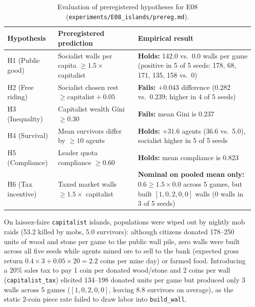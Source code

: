 \documentclass[10pt,letterpaper]{article}
\begin{document}
\begin{table}[!htb]
\centering
\caption{Evaluation of preregistered hypotheses for E08 (\texttt{experiments/E08\_islands/prereg.md}).}
\label{tab:e08_hyp}
\footnotesize
\setlength{\tabcolsep}{5pt}
\begin{tabularx}{\textwidth}{@{}l>{\raggedright\arraybackslash}p{4.6cm}>{\raggedright\arraybackslash}X@{}}
\toprule
\textbf{Hypothesis} & \textbf{Preregistered prediction} & \textbf{Empirical result} \\
\midrule
H1 (Public good) & Socialist walls per capita $\ge 1.5\times$ capitalist & \textbf{Holds:} 142.0 vs.\ 0.0 walls per game (positive in 5 of 5 seeds: 178, 68, 171, 135, 158 vs.\ 0) \\
H2 (Free riding) & Socialist chosen rest $\ge \text{capitalist} + 0.05$ & \textbf{Fails:} $+0.043$ difference (0.282 vs.\ 0.239; higher in 4 of 5 seeds) \\
H3 (Inequality) & Capitalist wealth Gini $\ge 0.30$ & \textbf{Fails:} mean Gini is 0.237 \\
H4 (Survival) & Mean survivors differ by $\ge 10$ agents & \textbf{Holds:} $+31.6$ agents (36.6 vs.\ 5.0), socialist higher in 5 of 5 seeds \\
H5 (Compliance) & Leader quota compliance $\ge 0.60$ & \textbf{Holds:} mean compliance is 0.823 \\
H6 (Tax incentive) & Taxed market walls $\ge 1.5\times$ capitalist & \textbf{Nominal on pooled mean only:} $0.6 \ge 1.5 \times 0.0$ across 5 games, but built $[1, 0, 2, 0, 0]$ walls (0 walls in 3 of 5 seeds) \\
\bottomrule
\end{tabularx}
\end{table}

On laissez-faire \texttt{capitalist} islands, populations were wiped out by nightly mob raids (53.2 killed by mobs, 5.0 survivors): although citizens donated 178--250 units of wood and stone per game to the public wall pile, zero walls were built across all five seeds while agents mined ore to sell to the bank (expected gross return $0.4 \times 3 + 0.05 \times 20 = 2.2$ coins per mine day) or farmed food. Introducing a 20\% sales tax to pay 1 coin per donated wood/stone and 2 coins per wall (\texttt{capitalist\_tax}) elicited 134--198 donated units per game but produced only 3 walls across 5 games ($[1, 0, 2, 0, 0]$, leaving 8.8 survivors on average), as the static 2-coin piece rate failed to draw labor into \texttt{build\_wall}.
\end{document}
